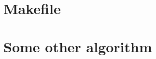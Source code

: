\documentclass[letterpaper,landscape]{article}
\begin{document}
\begin{multicols}{3}
    \tableofcontents
\end{multicols}
\clearpage

\section{Makefile}
\begin{multicols}{3}
    
\end{multicols}


\section{Some other algorithm}
%
\printindex
\end{document}
